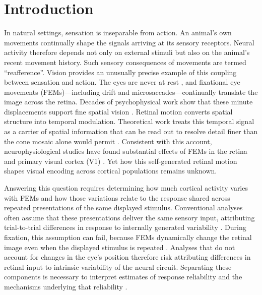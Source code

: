 \documentclass{lite}
\begin{document}
\section{Introduction}

In natural settings, sensation is inseparable from action. An animal's own movements continually shape the signals arriving at its sensory receptors. Neural activity therefore depends not only on external stimuli but also on the animal's recent movement history. Such sensory consequences of  movements are termed ``reafference''. Vision provides an unusually precise example of this coupling between sensation and action. The eyes are never at rest \cite{Jurin1738, martinez2017unchanging}, and fixational eye movements (FEMs)---including drift and microsaccades---continually translate the image across the retina. Decades of psychophysical work show that these minute displacements support fine spatial vision \cite{rucci2007miniature, ratnam2017benefits, intoy2020finely}. Retinal motion converts spatial structure into temporal modulation. Theoretical work treats this temporal signal as a carrier of spatial information \cite{rucci2015unsteady, rucci2018temporal, ahissar2012seeing} that can be read out to resolve detail finer than the cone mosaic alone would permit \cite{anderson2020high, assa2026temporal}. Consistent with this account, neurophysiological studies have found substantial effects of FEMs in the retina \cite{wu2024fixational} and primary visual cortex (V1) \cite{snodderly2001selective, kagan2008saccades, baudot2013animation, mcfarland2016variability}. Yet how this self-generated retinal motion shapes visual encoding across cortical populations remains unknown.

Answering this question requires determining how much cortical activity varies with FEMs and how those variations relate to the response shared across repeated presentations of the same displayed stimulus. Conventional analyses often assume that these presentations deliver the same sensory input, attributing trial-to-trial differences in response to internally generated variability \cite{tolhurst1983statistical, shadlen1998variable}. During fixation, this assumption can fail, because FEMs dynamically change the retinal image even when the displayed stimulus is repeated \cite{mcfarland2016variability}. Analyses that do not account for changes in the eye's position therefore risk attributing differences in retinal input to intrinsic variability of the neural circuit. Separating these components is necessary to interpret estimates of response reliability and the mechanisms underlying that reliability \cite{tolhurst1983statistical, softky1993highly, shadlen1998variable, gur1997response}.
\end{document}
